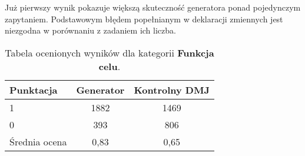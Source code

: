 

Już pierwszy wynik pokazuje większą skuteczność generatora ponad pojedynczym zapytaniem. Podstawowym błędem popełnianym w deklaracji zmiennych jest niezgodna w porównaniu z zadaniem ich liczba. %

\begin{table}[ht]
\caption{Tabela ocenionych wyników dla kategorii \textbf{Funkcja celu}.}\label{tab:tabela13}
\centering%
\begin{tabular}{|l|c|c|}
\hline
\textbf{Punktacja} & \textbf{Generator} & \textbf{Kontrolny DMJ}\\
\hline
1 & 1882 & 1469 \\
\hline
0 & 393 & 806 \\
\hline
Średnia ocena & 0,83 & 0,65 \\
\hline
\end{tabular}
\end{table}

